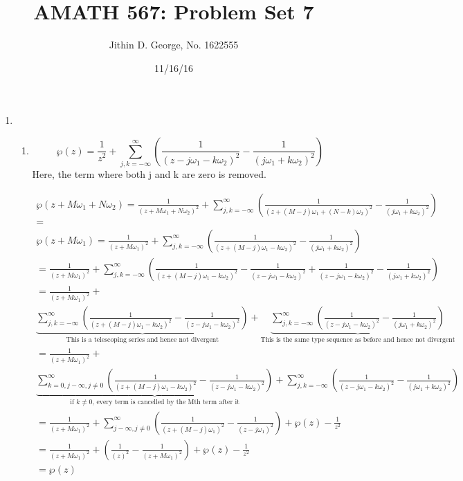 \documentclass[a4paper]{article}
\title{AMATH 567: Problem Set 7}
\author{Jithin D. George, No. 1622555}
\date{11/16/16}
\begin{document}
\maketitle
\begin{enumerate}
	
	\item
	\begin{enumerate}
		\item 
		\[
				\wp(z)=\frac{1}{z^2}+\sum_{j,k=-\infty}^\infty \left(\frac{1}{(z-j
					\omega_1-k \omega_2)^2}-\frac{1}{(j \omega_1+k \omega_2)^2}\right)		\]	
				Here, the term where both j and k are zero is removed.	                         
			\begin{center}             
			\begin{gather*}
		\wp(z+M \omega_1+N \omega_2)=\frac{1}{(z+M \omega_1+N \omega_2)^2}+\sum_{j,k=-\infty}^\infty \left(\frac{1}{(z+(M-j)
			\omega_1+(N-k) \omega_2)^2}-\frac{1}{(j \omega_1+k \omega_2)^2}\right)	
		\\= \\	
	\wp(z+M \omega_1)=\frac{1}{(z+M \omega_1)^2}+\sum_{j,k=-\infty}^\infty \left(\frac{1}{(z+(M-j)
		\omega_1-k \omega_2)^2} -\frac{1}{(j \omega_1+k \omega_2)^2}\right)	
		\\= \frac{1}{(z+M \omega_1)^2}+\sum_{j,k=-\infty}^\infty \left(\frac{1}{(z+(M-j)
			\omega_1-k \omega_2)^2} -\frac{1}{(z-j
			\omega_1-k \omega_2)^2}+\frac{1}{(z-j
			\omega_1-k \omega_2)^2}-\frac{1}{(j \omega_1+k \omega_2)^2}\right)	
		\\= \frac{1}{(z+M \omega_1)^2}+\\\underbrace{\sum_{j,k=-\infty}^\infty \left(\frac{1}{(z+(M-j)
			\omega_1-k \omega_2)^2} -\frac{1}{(z-j
			\omega_1-k \omega_2)^2}\right)}_\text{This is a telescoping series and hence not divergent}+\underbrace{\sum_{j,k=-\infty}^\infty \left(\frac{1}{(z-j
			\omega_1-k \omega_2)^2}-\frac{1}{(j \omega_1+k \omega_2)^2}\right)}_\text{This is the same type sequence as before and hence not divergent} 
	\\=	\frac{1}{(z+M \omega_1)^2}+\\\underbrace{\sum_{k=0,j-\infty, j\neq 0}^\infty \left(\frac{1}{(z+(M-j)
			\omega_1-k \omega_2)^2} -\frac{1}{(z-j
			\omega_1-k \omega_2)^2}\right)}_\text{if $k\neq0$, every term is cancelled by the Mth term after it} 	+\sum_{j,k=-\infty}^\infty \left(\frac{1}{(z-j
			\omega_1-k \omega_2)^2}-\frac{1}{(j \omega_1+k \omega_2)^2}\right)	
	\\=	\frac{1}{(z+M \omega_1)^2}+\sum_{j-\infty, j\neq 0}^\infty \left(\frac{1}{(z+(M-j)
			\omega_1)^2} -\frac{1}{(z-j
			\omega_1)^2}\right)	+\wp(z) - \frac{1}{z^2}		
	\\=	\frac{1}{(z+M \omega_1)^2}+ \left(\frac{1}{(z)^2} -\frac{1}{(z+M
		\omega_1)^2}\right)	+\wp(z) - \frac{1}{z^2}	
\\	=\wp(z)
								\end{gather*} 
						\end{center}
		

\end{enumerate}
\end{enumerate}
\end{document}
